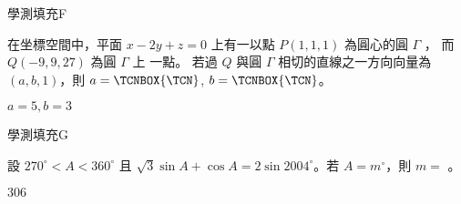     \begin{QUESTION}
        \begin{ExamInfo}{93}{學測}{填充}{F}
        \end{ExamInfo}
        \begin{ExamAnsRateInfo}{26}{61}{15}{2}
        \end{ExamAnsRateInfo}
        \begin{QBODY}
            在坐標空間中，平面 $x-2y+z=0$ 上有一以點 $P(1,1,1)$ 為圓心的圓 $\Gamma$ ，
            而 $Q(-9,9, 27)$ 為圓 $\Gamma$ 上 一點。
            若過 $Q$ 與圓  $\Gamma$ 相切的直線之一方向向量為 $(a, b, 1)$，則 $a= 
            \TCNBOX{\TCN}$, $b= 
            \TCNBOX{\TCN}$。
        \end{QBODY}
        \begin{QFROMS}
        \end{QFROMS}
        \begin{QTAGS}\end{QTAGS}
        \begin{QANS}
            $a=5, b=3$
        \end{QANS}
        \begin{QSOLLIST}
        \end{QSOLLIST}
        \begin{QEMPTYSPACE}
        \end{QEMPTYSPACE}
    \end{QUESTION}
    \begin{QUESTION}
        \begin{ExamInfo}{93}{學測}{填充}{G}
        \end{ExamInfo}
        \begin{ExamAnsRateInfo}{10}{27}{3}{0}
        \end{ExamAnsRateInfo}
        \begin{QBODY}
            設 $270^\circ <A< 360^\circ$ 且 $\sqrt{3}\sin A+ \cos A=2 \sin {2004} ^\circ$。若 $A=m^\circ$，則 $m=$
            \TCNBOX{\TCN\TCN\TCN}。
        \end{QBODY}
        \begin{QFROMS}
        \end{QFROMS}
        \begin{QTAGS}\end{QTAGS}
        \begin{QANS}
            $306$
        \end{QANS}
        \begin{QSOLLIST}
        \end{QSOLLIST}
        \begin{QEMPTYSPACE}
        \end{QEMPTYSPACE}
    \end{QUESTION}
